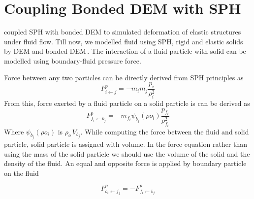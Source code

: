 \section{Coupling Bonded DEM with SPH}
\label{sec:coupling-bonded-dem}


\citeauthor{wu-2016-coupl-sph} coupled SPH with bonded DEM to simulated
deformation of elastic structures under fluid flow. Till now, we modelled fluid
using SPH, rigid and elastic solids by DEM and bonded DEM\,. The interaction of
a fluid particle with solid can be modelled using boundary-fluid pressure force.

Force between any two particles can be directly derived from SPH principles
as
\begin{equation}
  F^p_{i \leftarrow j} = -m_{i} m_{j} \frac{p_{i}}{\rho^2_{i}}
\end{equation}
From this, force exerted by a fluid particle on a solid particle is can be
derived as
\begin{equation}
  F^p_{f_i \leftarrow b_j} = -m_{f_i} \psi_{b_j}(\rho o_{i}) \frac{p_{f_i}}{\rho^2_{f_i}}
\end{equation}
Where $\psi_{b_j}(\rho o_{i}) $ is $\rho_o \, V_{b_j}$. While computing the
force between the fluid and solid particle, solid particle is assigned with
volume. In the force equation rather than using the mass of the solid particle
we should use the volume of the solid and the density of the fluid. An equal and
opposite force is applied by boundary particle on the fluid

\begin{equation}
  F^p_{b_i \leftarrow f_j} = -F^p_{f_i \leftarrow b_j}
\end{equation}




